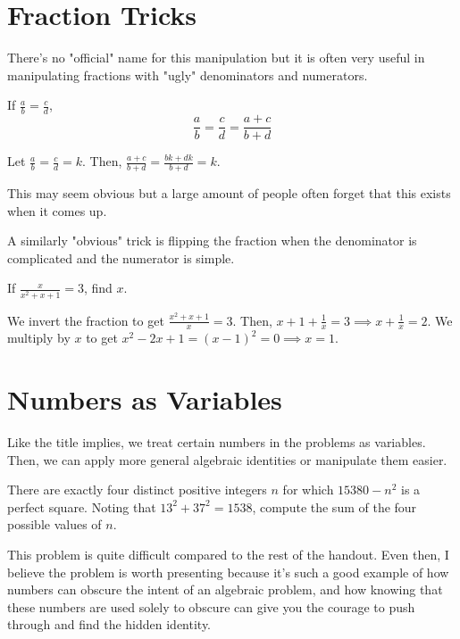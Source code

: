 \documentclass{article}
\begin{document}
\section{Fraction Tricks}
There's no "official" name for this manipulation but it is often very useful in manipulating fractions with "ugly" denominators and numerators. 
\begin{theo}
If $\frac{a}{b}=\frac{c}{d}$,
\\
$$\frac{a}{b}=\frac{c}{d}=\frac{a+c}{b+d}$$
\end{theo}

\begin{pro}
Let $\frac{a}{b}=\frac{c}{d}=k$. Then, $\frac{a+c}{b+d}=\frac{bk+dk}{b+d}=k$.
\end{pro}

This may seem obvious but a large amount of people often forget that this exists when it comes up.

A similarly "obvious" trick is flipping the fraction when the denominator is complicated and the numerator is simple.

\begin{exam}[Classic]
If $\frac{x}{x^2+x+1}=3$, find $x$.
\end{exam}

\begin{sol}
We invert the fraction to get $\frac{x^2+x+1}{x}=3$. Then, $x+1+\frac{1}{x}=3\implies x+\frac{1}{x}=2$. We multiply by $x$ to get $x^2-2x+1=(x-1)^2=0\implies x=1$.
\end{sol}

\section{Numbers as Variables}
Like the title implies, we treat certain numbers in the problems as variables. Then, we can apply more general algebraic identities or manipulate them easier.
\begin{exam}[SMT 2021/N5]
There are exactly four distinct positive integers $n$ for which $15380 - n^2$ is a perfect square. Noting that $13^2 + 37^2 = 1538$, compute the sum of the four possible values of $n$.
\end{exam}

This problem is quite difficult compared to the rest of the handout. Even then, I believe the problem is worth presenting because it's such a good example of how numbers can obscure the intent of an algebraic problem, and how knowing that these numbers are used solely to obscure can give you the courage to push through and find the hidden identity.
\end{document}
